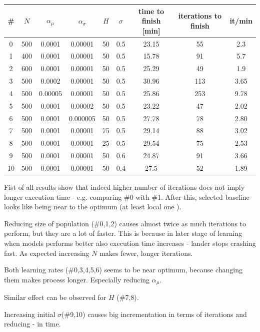 \documentclass[12pt]{article}
\begin{document}
\begin{table}
\centering
\begin{tabular}{|c|c|c|c|c|c|c|c|c|}
\hline 
\# & $N$	& $\alpha_\mu$	& $\alpha_\sigma$	& $H$	& $\sigma$ &	time to finish [min]&	iterations to finish & it/min\\
\hline
0 & 500     &  0.0001	& 0.00001	& 50	& 0.5	& 23.15 &	55   & 2.3 \\
1  & 400	&  0.0001	& 0.00001	& 50	& 0.5	& 15.78 &	91   & 5.7\\
2  & 600	&  0.0001	& 0.00001	& 50	& 0.5	& 25.29 &	49   & 1.9\\
3  & 500	&  0.0002	& 0.00001	& 50	& 0.5	& 30.96 &	113  &  3.65\\
4  & 500	&  0.00005	& 0.00001	& 50	& 0.5	& 25.86 &	253  &  9.78\\
5  & 500	&  0.0001	& 0.00002	& 50	& 0.5	& 23.22 &	47   & 2.02\\
6  & 500	&  0.0001	& 0.000005 & 	50 	& 0.5	& 27.78 &	78   & 2.80\\
7  & 500	&  0.0001	& 0.00001	& 75	& 0.5	& 29.14 &	88   & 3.02\\
8  & 500	&  0.0001	& 0.00001	& 25	& 0.5	& 29.54 &	75   & 2.53\\
9  & 500	&  0.0001	& 0.00001	& 50	& 0.6	& 24.87 &	91   & 3.66\\
10 &  500&     0.0001	& 0.00001	& 50	& 0.4	&  27.5 &	52   & 1.89\\
\hline
\end{tabular} 
\end{table}
Fist of all results show that indeed higher number of iterations does not imply longer execution time - e.g. comparing \#0 with \#1. After this, selected baseline looks like being near to the optimum (at least local one ).

Reducing size of population (\#0,1,2) causes almost twice as much iterations to perform, but they are a lot of faster. This is because in later stage of learning when models performs better also execution time increases - lander stops crashing fast. As expected increasing $N$ makes fewer, longer iterations.

Both learning rates (\#0,3,4,5,6) seems to be near optimum, because changing them makes process longer. Especially reducing $\alpha_\mu$.

Similar effect can be observed for $H$ (\#7,8).

Increasing initial $\sigma$(\#9,10) causes big incrementation in terms of iterations and reducing - in time.
\end{document}
